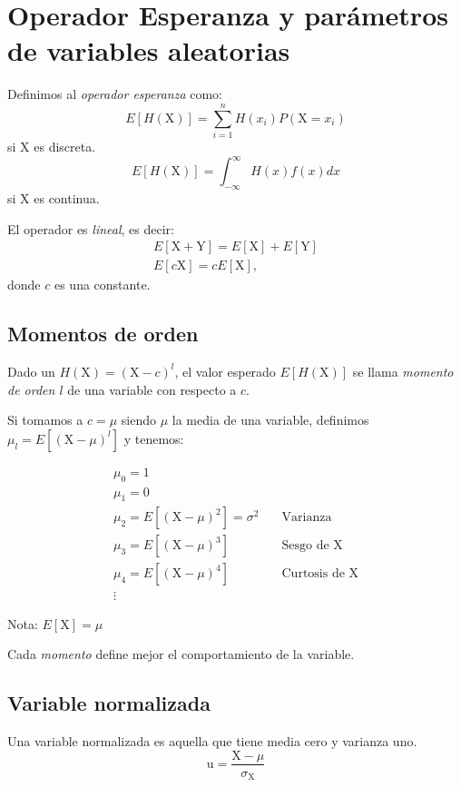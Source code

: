 \documentclass[openany]{book}
\begin{document}
\section{Operador Esperanza y parámetros de variables aleatorias}
Definimos al \emph{operador esperanza} como:
\begin{equation*}
  E[H(\mathrm{X})]=\sum_{i=1}^{n}H(x_i)P(\mathrm{X}=x_i)
\end{equation*}
si X es discreta.
\begin{equation*}
  E\left[H(\mathrm{X})\right]=\int_{-\infty}^{\infty}H(x)f(x)dx
\end{equation*}
si X es continua.
\par El operador es \emph{lineal}, es decir:
\begin{gather*}
  E\left[\mathrm{X}+\mathrm{Y}\right]=E\left[\mathrm{X}\right]+E\left[\mathrm{Y}\right]\\
  E\left[c\mathrm{X}\right]=cE\left[\mathrm{X}\right],
\end{gather*}
donde $c$ es una constante.

\subsection{Momentos de orden}
Dado un $H(\mathrm{X})=(\mathrm{X}-c)^{l}$, el valor esperado $E\left[H(\mathrm{X})\right]$ se llama \emph{momento de orden $l$} de una variable con respecto a $c$.
\par Si tomamos a $c=\mu$ siendo $\mu$ la media de una variable, definimos $\mu_{l}=E\left[(\mathrm{X}-\mu)^{l}\right]$ y tenemos:

\begin{align*}
  \mu_0=1\quad &\\
  \mu_1=0\quad &\\
  \mu_2=E\left[(\mathrm{X}-\mu)^2\right]=\sigma^2\quad &\mathrm{Varianza}\\
  \mu_3=E\left[(\mathrm{X}-\mu)^3\right]\quad &\textrm{Sesgo de X}\\
  \mu_4=E\left[(\mathrm{X}-\mu)^4\right]\quad &\textrm{Curtosis de X}\\
  \vdots\quad &
\end{align*}

Nota: $E\left[\mathrm{X}\right]=\mu$

\par Cada \emph{momento} define mejor el comportamiento de la variable.

\subsection{Variable normalizada}
Una variable normalizada es aquella que tiene media cero y varianza uno.
\begin{equation}
  \label{eq:variable-normalizada}
  \mathrm{u}=\frac{\mathrm{X}-\mu}{\sigma_{\mathrm{X}}}
\end{equation}
\end{document}
